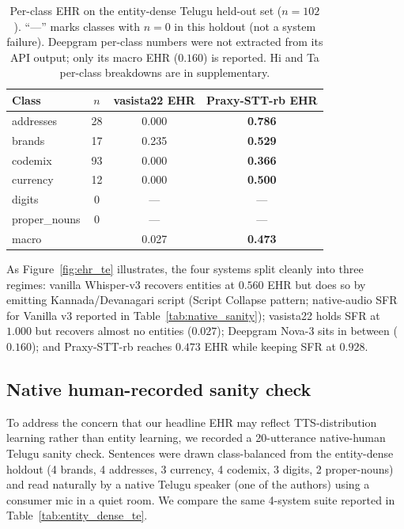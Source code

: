 \documentclass[conference,a4paper]{IEEEtran}
\begin{document}
\begin{table}[t]
\centering
\caption{Per-class EHR on the entity-dense Telugu held-out set ($n=102$). ``---'' marks classes with $n=0$ in this holdout (not a system failure). Deepgram per-class numbers were not extracted from its API output; only its macro EHR ($0.160$) is reported. Hi and Ta per-class breakdowns are in supplementary.}
\label{tab:per_class_ehr_te}
\begin{tabular}{lccc}
\toprule
Class & $n$ & vasista22 EHR & \textbf{Praxy-STT-rb} EHR \\
\midrule
addresses     & 28 & 0.000 & \textbf{0.786} \\
brands        & 17 & 0.235 & \textbf{0.529} \\
codemix       & 93 & 0.000 & \textbf{0.366} \\
currency      & 12 & 0.000 & \textbf{0.500} \\
digits        & 0  & ---   & ---            \\
proper\_nouns & 0  & ---   & ---            \\
\midrule
macro         &    & 0.027 & \textbf{0.473} \\
\bottomrule
\end{tabular}
\end{table}

As Figure~\ref{fig:ehr_te} illustrates, the four systems split cleanly into three regimes: vanilla Whisper-v3 recovers entities at $0.560$ EHR but does so by emitting Kannada/Devanagari script (Script Collapse pattern; native-audio SFR for Vanilla v3 reported in Table~\ref{tab:native_sanity}); vasista22 holds SFR at $1.000$ but recovers almost no entities ($0.027$); Deepgram Nova-3 sits in between ($0.160$); and Praxy-STT-rb reaches $0.473$ EHR while keeping SFR at $0.928$.

\subsection{Native human-recorded sanity check}\label{sec:native_sanity}

To address the concern that our headline EHR may reflect TTS-distribution learning rather than entity learning, we recorded a 20-utterance native-human Telugu sanity check. Sentences were drawn class-balanced from the entity-dense holdout (4 brands, 4 addresses, 3 currency, 4 codemix, 3 digits, 2 proper-nouns) and read naturally by a native Telugu speaker (one of the authors) using a consumer mic in a quiet room. We compare the same 4-system suite reported in Table~\ref{tab:entity_dense_te}.
\end{document}
